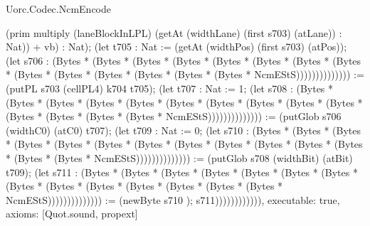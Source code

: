 \begin{lexlean}{Uorc.Codec.NcmEncode}
\begin{semanticmodule}
{(prim multiply (laneBlockInLPL) (getAt (widthLane) (first s703) (atLane)) : Nat)) + vb) : Nat); (let t705 : Nat := (getAt (widthPos) (first s703) (atPos)); (let s706 : (Bytes * (Bytes * (Bytes * (Bytes * (Bytes * (Bytes * (Bytes * (Bytes * (Bytes * (Bytes * (Bytes * (Bytes * (Bytes * (Bytes * NcmEStS)))))))))))))) := (putPL s703 (cellPL4) k704 t705); (let t707 : Nat := 1; (let s708 : (Bytes * (Bytes * (Bytes * (Bytes * (Bytes * (Bytes * (Bytes * (Bytes * (Bytes * (Bytes * (Bytes * (Bytes * (Bytes * (Bytes * NcmEStS)))))))))))))) := (putGlob s706 (widthC0) (atC0) t707); (let t709 : Nat := 0; (let s710 : (Bytes * (Bytes * (Bytes * (Bytes * (Bytes * (Bytes * (Bytes * (Bytes * (Bytes * (Bytes * (Bytes * (Bytes * (Bytes * (Bytes * NcmEStS)))))))))))))) := (putGlob s708 (widthBit) (atBit) t709); (let s711 : (Bytes * (Bytes * (Bytes * (Bytes * (Bytes * (Bytes * (Bytes * (Bytes * (Bytes * (Bytes * (Bytes * (Bytes * (Bytes * (Bytes * NcmEStS)))))))))))))) := (newByte s710 ); s711)))))))))))),
  executable: true,
  axioms: [Quot.sound, propext]
}


\end{semanticmodule}
\end{lexlean}
